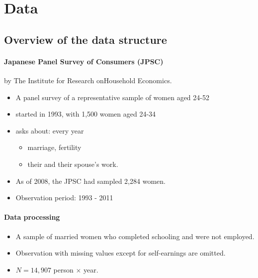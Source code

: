 \documentclass[../root]{subfiles}
\begin{document}
    \section{Data}
    \subsection{Overview of the data structure}

    \paragraph{Japanese Panel Survey of Consumers (JPSC)}

    by The Institute for Research onHousehold Economics.

    \begin{itemize}
      \item A panel survey of a representative sample of women aged 24-52
      \item started in 1993, with 1,500 women aged 24-34
      \item asks about: every year
      \begin{itemize}
        \item marriage, fertility
        \item their and their spouse's work.
      \end{itemize}
      \item As of 2008, the JPSC had sampled 2,284 women.
      \item Observation period: 1993 - 2011
    \end{itemize}

    \paragraph{Data processing}

    \begin{itemize}
      \item A sample of married women who completed schooling and were not employed.
      \item Observation with missing values except for self-earnings are omitted.
      \item $N = 14,907$ person $\times$ year.
    \end{itemize}
\end{document}
